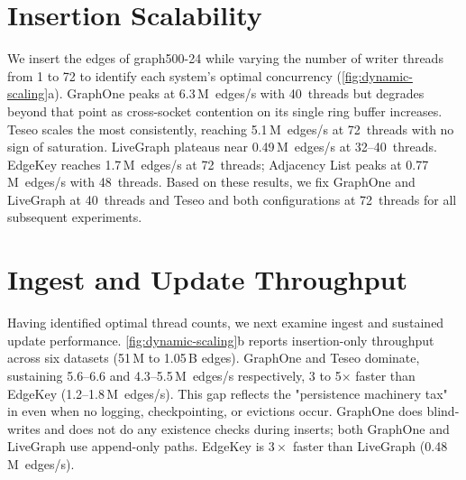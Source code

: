 \section{Insertion Scalability}

We insert the edges of graph500-24 while varying the number of writer threads from 1 to 72 to identify each system's optimal concurrency (\autoref{fig:dynamic-scaling}a).
GraphOne peaks at 6.3\,M~edges/s with 40~threads but degrades beyond that point as cross-socket contention on its single ring buffer increases.
Teseo scales the most consistently, reaching 5.1\,M~edges/s at 72~threads with no sign of saturation.
LiveGraph plateaus near 0.49\,M~edges/s at 32--40~threads.
\project{} EdgeKey reaches 1.7\,M~edges/s at 72~threads; Adjacency List peaks at 0.77\,M~edges/s with 48~threads.
Based on these results, we fix GraphOne and LiveGraph at 40~threads and Teseo and both \project{} configurations at 72~threads for all subsequent experiments.

\section{Ingest and Update Throughput}

Having identified optimal thread counts, we next examine ingest and sustained update performance.
\autoref{fig:dynamic-scaling}b reports insertion-only throughput across six datasets (51\,M to 1.05\,B edges).
GraphOne and Teseo dominate, sustaining 5.6--6.6 and 4.3--5.5\,M~edges/s respectively, 3 to 5$\times$ faster than \project{} EdgeKey (1.2--1.8\,M~edges/s).
This gap reflects the "persistence machinery tax" in \project{} even when no logging, checkpointing, or evictions occur.
GraphOne does blind-writes and does not do any existence checks during inserts; both GraphOne and LiveGraph use append-only paths.
\project{} EdgeKey is $3\times$ faster than LiveGraph (0.48\,M~edges/s).

